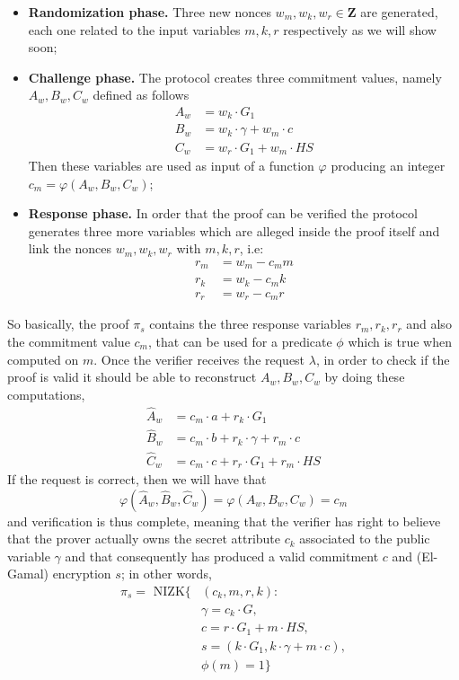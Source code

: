 \documentclass[twocolumn]{article}
\begin{document}
\begin{itemize}
    \item \textbf{Randomization phase.} Three new nonces $w_m, w_k, w_r\in \mathbf{Z}$ are generated, each one related to the input variables $m, k, r$ respectively as we will show soon; 
    \item \textbf{Challenge phase.} The protocol creates three commitment values, namely $A_w, B_w, C_w$ defined as follows
    \begin{align*}
        A_w &= w_k\cdot G_1 \\ 
        B_w &= w_k\cdot\gamma + w_m\cdot c \\
        C_w &= w_r\cdot G_1 + w_m \cdot HS
    \end{align*}
    Then these variables are used as input of a function $\varphi$ producing an integer $c_m=\varphi(A_w,B_w,C_w)$;
    \item \textbf{Response phase.} In order that the proof can be verified the protocol generates three more variables which are alleged inside the proof itself and link the nonces $w_m, w_k, w_r$ with $m, k, r$, i.e:
    \begin{align*}
        r_m &= w_m - c_m m \\
        r_k &= w_k - c_m k \\
        r_r &= w_r - c_m r
    \end{align*}
\end{itemize}
So basically, the proof $\pi_s$ contains the three response variables $r_m, r_k, r_r$ and also the commitment value $c_m$, that can be used for a predicate $\phi$ which is true when computed on $m$. Once the verifier receives the request $\lambda$, in order to check if the proof is valid it should be able to reconstruct  $A_w, B_w, C_w$ by doing these computations,
\begin{align*}
\widehat{A}_w &= c_m\cdot a + r_k\cdot G_1 \\
\widehat{B}_w &= c_m\cdot b + r_k\cdot \gamma + r_m\cdot c \\
\widehat{C}_w &= c_m\cdot c + r_r\cdot G_1 + r_m\cdot HS
\end{align*}
If the request is correct, then we will have that 
\[
\varphi(\widehat{A}_w,\widehat{B}_w,\widehat{C}_w) = \varphi(A_w,B_w,C_w) = c_m
\]
and verification is thus complete, meaning that the verifier has right to believe that the prover actually owns the secret attribute $c_k$ associated to the public variable $\gamma$ and that consequently has produced a valid commitment $c$ and (El-Gamal) encryption $s$; in other words,
\begin{align*}
\pi_s = \text{ NIZK}\{&(c_k, m, r, k): \\
&\gamma = c_k\cdot G, \\
&c = r\cdot G_1 + m\cdot HS, \\
&s = (k \cdot G_1, k\cdot \gamma + m\cdot c), \\
&\phi(m)=1\}
\end{align*}
\end{document}
